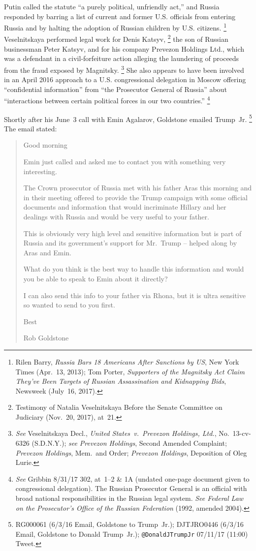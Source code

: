 Putin called the statute ``a purely political, unfriendly act,'' and Russia responded by barring a list of current and former U.S. officials from entering Russia and by halting the adoption of Russian children by U.S. citizens.%
\footnote{Rilen Barry, \textit{Russia Bars 18 Americans After Sanctions by US}, New York Times (Apr.~13, 2013);
Tom Porter, \textit{Supporters of the Magnitsky Act Claim They've Been Targets of Russian Assassination and Kidnapping Bids}, Newsweek (July~16, 2017).}
Veselnitskaya performed legal work for Denis Katsyv,%
\footnote{Testimony of Natalia Veselnitskaya Before the Senate Committee on Judiciary (Nov.~20, 2017), at~21.}
the son of Russian businessman Peter Katsyv, and for his company Prevezon Holdings Ltd., which was a defendant in a civil-forfeiture action alleging the laundering of proceeds from the fraud exposed by Magnitsky.%
\footnote{\textit{See} Veselnitskaya Decl., \textit{United States~v.\ Prevezon Holdings, Ltd.}, No.~13-cv-6326 (S.D.N.Y.);
\textit{see Prevezon Holdings}, Second Amended Complaint;
\textit{Prevezon Holdings}, Mem.\ and Order;
\textit{Prevezon Holdings}, Deposition of Oleg Lurie.}
She also appears to have been involved in an April 2016 approach to a U.S. congressional delegation in Moscow offering ``confidential information'' from ``the Prosecutor General of Russia'' about ``interactions between certain political forces in our two countries.''%
\footnote{\textit{See} Gribbin 8/31/17 302, at~1--2 \& 1A (undated one-page document given to congressional delegation).
The Russian Prosecutor General is an official with broad national responsibilities in the Russian legal system.
\textit{See Federal Law on the Prosecutor's Office of the Russian Federation} (1992, amended 2004).}

Shortly after his June~3 call with Emin Agalarov, Goldstone emailed Trump~Jr.%
\footnote{RG000061 (6/3/16 Email, Goldstone to Trump~Jr.);
DJTJRO0446 (6/3/16 Email, Goldstone to Donald Trump~Jr.);
\verb+@DonaldJTrumpJr+ 07/11/17 (11:00) Tweet.}
The email stated:

\begin{quote}
Good morning

Emin just called and asked me to contact you with something very interesting.

The Crown prosecutor of Russia met with his father Aras this morning and in their meeting offered to provide the Trump campaign with some official documents and information that would incriminate Hillary and her dealings with Russia and would be very useful to your father.

This is obviously very high level and sensitive information but is part of Russia and its government's support for Mr.~Trump -- helped along by Aras and Emin.

What do you think is the best way to handle this information and would you be able to speak to Emin about it directly?

I can also send this info to your father via Rhona, but it is ultra sensitive so wanted to send to you first.

Best

Rob Goldstone
\end{quote}

